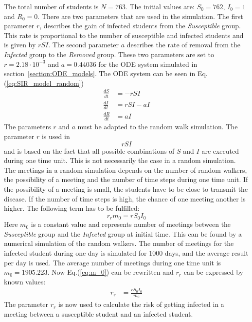 \documentclass[%
twoside,                 %
final,                   %
chapterprefix=true,      %
open=right               %
10pt]{book}
\begin{document}
\noindent
The total number of students is $N=763$. The initial values are: $S_0=762$, $I_0=1$ and $R_0=0$. There are two parameters that are used in the simulation. The first parameter $r$, describes the gain of infected students from the \emph{Susceptible} group. This rate is proportional to the number of susceptible and infected students and is given by $rSI$. The second parameter $a$ describes the rate of removal from the \emph{Infected} group to the \emph{Removed} group. These two parameters are set to $r=2.18\cdot 10^{-3}$ and $a=0.44036$ for the ODE system simulated in section~\ref{section:ODE_models}. The ODE system can be seen in Eq.(\ref{eq:SIR_model_random})
\begin{equation} \label{eq:SIR_model_random}
	\begin{aligned} 
	\frac{dS}{dt} &= -rSI \\ 
	\frac{dI}{dt} &= rSI-aI \\ 
	\frac{dR}{dt} &= aI 
	\end{aligned}
\end{equation}
The parameters $r$ and $a$ must be adapted to the random walk simulation. The parameter $r$ is used in
\begin{equation} \label{eq:rSI}
rSI
\end{equation}
and is based on the fact that all possible combinations of $S$ and $I$ are executed during one time unit. This is not necessarily the case in a random simulation. The meetings in a random simulation depends on the number of random walkers, the possibility of a meeting and the number of time steps during one time unit. If the possibility of a meeting is small, the students have to be close to transmit the disease. If the number of time steps is high, the chance of one meeting another is higher. The following term has to be fulfilled: 
\begin{equation} \label{eq:m_0}
r_r m_0 = rS_0I_0
\end{equation}
Here $m_0$ is a constant value and represents number of meetings between the \emph{Susceptible} group and the \emph{Infected} group at initial time. This can be found by a numerical simulation of the random walkers. The number of meetings for the infected student during one day is simulated for 1000 days, and the average result per day is used. The average number of meetings during one time unit is $m_0=1905.223$. Now Eq.(\ref{eq:m_0}) can be rewritten and $r_r$ can be expressed by known values: 
\begin{equation} \label{eq:m_0_2}
	\begin{aligned} 
	r_r &= \frac{rS_0I_0}{m_0}
	\end{aligned}
\end{equation}
The parameter $r_r$ is now used to calculate the risk of getting infected in a meeting between a susceptible student and an infected student. 
\end{document}
